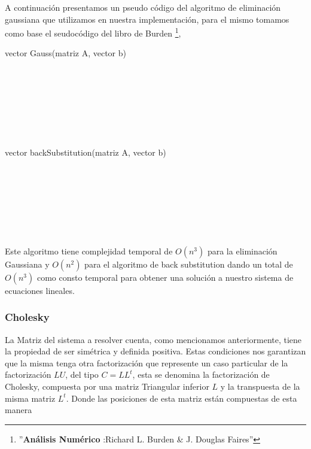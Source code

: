 A continuación presentamos un pseudo código del algoritmo de eliminación gaussiana que utilizamos en nuestra implementación, para el mismo tomamos como base el seudocódigo del libro de Burden \footnote{''\textbf{Análisis Numérico }:Richard L. Burden & J. Douglas Faires''},

\begin{algorithm}
    \begin{algorithmic}[1]\parskip=2mm  
        \caption{vector Gauss(matriz A, vector b)}
        \\
        \\
        \\
        \\
        \\
        \\
    \end{algorithmic}
\end{algorithm}


\begin{algorithm}
    \begin{algorithmic}[1]\parskip=2mm
        \caption{vector backSubstitution(matriz A, vector b)}
        \\
        \\
        \\
        \\
        \\
        \\
    \end{algorithmic}
\end{algorithm}

Este algoritmo tiene complejidad temporal de $O(n^{3})$ para la eliminación Gaussiana y $O(n^{2})$ para el algoritmo de back substitution dando un total de $O(n^{3})$ como consto temporal para obtener una solución a nuestro sistema de ecuaciones lineales.

\newpage
\subsubsection{Cholesky}
La Matriz del sistema a resolver cuenta, como mencionamos anteriormente, tiene la propiedad de ser simétrica y definida positiva. Estas condiciones nos garantizan que la misma tenga otra factorización que represente un caso particular de la factorización $LU$, del tipo $C=LL^{t}$, esta se denomina la factorización de Cholesky, compuesta por una matriz Triangular inferior $L$ y la transpuesta de la misma matriz $L^{t}$. Donde las posiciones de esta matriz están compuestas de esta manera


